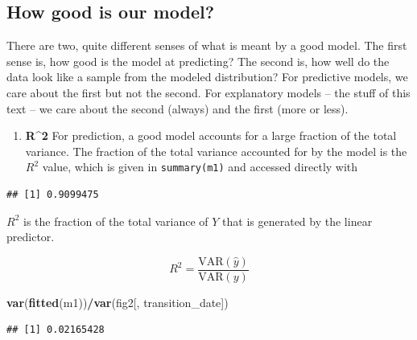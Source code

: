 \documentclass[]{book}
\newenvironment{Shaded}{\begin{snugshade}}{\end{snugshade}}
\newcommand{\KeywordTok}[1]{\textcolor[rgb]{0.13,0.29,0.53}{\textbf{#1}}}
\newcommand{\NormalTok}[1]{#1}
\newcommand{\OperatorTok}[1]{\textcolor[rgb]{0.81,0.36,0.00}{\textbf{#1}}}
\providecommand{\tightlist}{%
  \setlength{\itemsep}{0pt}\setlength{\parskip}{0pt}}
\begin{document}
\hypertarget{how-good-is-our-model}{%
\subsection{How good is our model?}\label{how-good-is-our-model}}

There are two, quite different senses of what is meant by a good model. The first sense is, how good is the model at predicting? The second is, how well do the data look like a sample from the modeled distribution? For predictive models, we care about the first but not the second. For explanatory models -- the stuff of this text -- we care about the second (always) and the first (more or less).

\begin{enumerate}
\def\labelenumi{\arabic{enumi}.}
\tightlist
\item
  \textbf{R\^{}2} For prediction, a good model accounts for a large fraction of the total variance. The fraction of the total variance accounted for by the model is the \(R^2\) value, which is given in \texttt{summary(m1)} and accessed directly with
\end{enumerate}

\begin{Shaded}
\end{Shaded}

\begin{verbatim}
## [1] 0.9099475
\end{verbatim}

\(R^2\) is the fraction of the total variance of \(Y\) that is generated by the linear predictor.

\begin{equation}
R^2 = \frac{\mathrm{VAR}(\hat{y})}{\mathrm{VAR}(y)}
\end{equation}

\begin{Shaded}
\begin{Highlighting}[]
\KeywordTok{var}\NormalTok{(}\KeywordTok{fitted}\NormalTok{(m1))}\OperatorTok{/}\KeywordTok{var}\NormalTok{(fig2[, transition_date])}
\end{Highlighting}
\end{Shaded}

\begin{verbatim}
## [1] 0.02165428
\end{verbatim}
\end{document}
